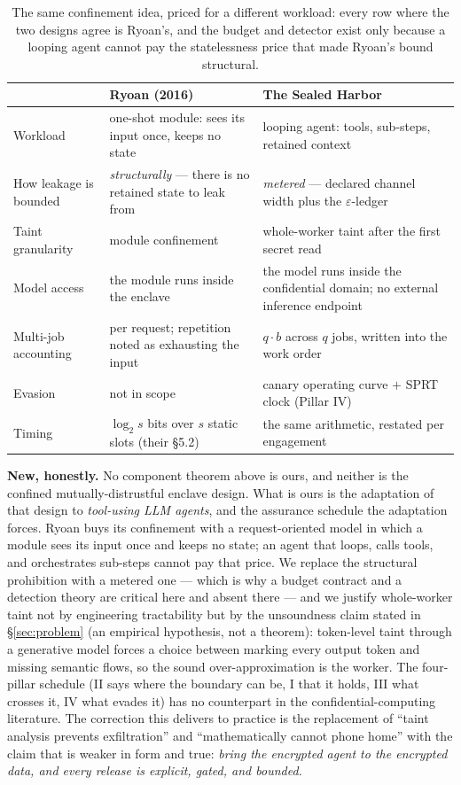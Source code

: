 \documentclass[11pt,a4paper]{article}
\begin{document}
\begin{table}[htbp]
\centering
\small
\begin{tabular}{@{}p{3.0cm}p{5.2cm}p{5.2cm}@{}}
\toprule
 & Ryoan (2016) \cite{ryoan16} & The Sealed Harbor \\
\midrule
Workload & one-shot module: sees its input once, keeps no state & looping agent: tools, sub-steps, retained context \\
How leakage is bounded & \emph{structurally} --- there is no retained state to leak from & \emph{metered} --- declared channel width plus the $\varepsilon$-ledger \\
Taint granularity & module confinement & whole-worker taint after the first secret read \\
Model access & the module runs inside the enclave & the model runs inside the confidential domain; no external inference endpoint \\
Multi-job accounting & per request; repetition noted as exhausting the input & $q\cdot b$ across $q$ jobs, written into the work order \\
Evasion & not in scope & canary operating curve $+$ SPRT clock (Pillar IV) \\
Timing & $\log_2 s$ bits over $s$ static slots (their \S5.2) & the same arithmetic, restated per engagement \\
\bottomrule
\end{tabular}
\caption{The same confinement idea, priced for a different workload: every row where the two designs agree is Ryoan's, and the
budget and detector exist only because a looping agent cannot pay the statelessness price that made Ryoan's bound structural.}
\label{tab:ryoan}
\end{table}

\textbf{New, honestly.} No component theorem above is ours, and neither is the confined mutually-distrustful enclave design.
What is ours is the adaptation of that design to \emph{tool-using LLM agents}, and the assurance schedule the adaptation
forces. Ryoan buys its confinement with a request-oriented model in which a module sees its input once and keeps no state; an
agent that loops, calls tools, and orchestrates sub-steps cannot pay that price. We replace the structural prohibition with a
metered one --- which is why a budget contract and a detection theory are critical here and absent there --- and we justify
whole-worker taint not by engineering tractability but by the unsoundness claim stated in \S\ref{sec:problem} (an empirical
hypothesis, not a theorem): token-level taint through a generative
model forces a choice between marking every output token and missing semantic flows, so the sound over-approximation is the
worker. The four-pillar schedule (II says where the boundary can be, I that it holds, III what crosses it, IV what evades it) has
no counterpart in the confidential-computing literature. The correction this delivers to practice is the replacement of ``taint
analysis prevents exfiltration'' and ``mathematically cannot phone home'' with the claim that is weaker in form and true:
\emph{bring the encrypted agent to the encrypted data, and every release is explicit, gated, and bounded.}
\end{document}
